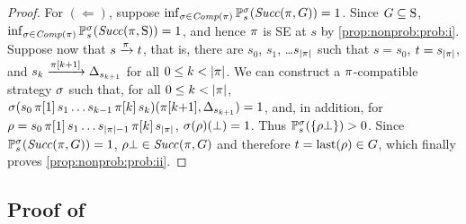 \begin{proof}
  For $(\Leftarrow)$, suppose
  $\inf_{\strat\in\Comp(\plan)}\Prob^\strat_s(\Succ(\plan,G))=1$.
  Since $G\subseteq\S$,
  $\inf_{\strat\in\Comp(\plan)}\Prob^\strat_s(\Succ(\plan,\S))=1$, and
  hence $\plan$ is SE at $s$ by \cref{prop:nonprob:prob:i}.
  Suppose now that $s \reach{\plan} t$, that is, there are $s_0$,
  $s_1$, \ldots $s_{\size{\plan}}$ such that $s=s_0$, $t=s_{\size{\plan}}$, and
  $s_k\reach{\plan[k{+}1]}\Dirac_{s_{k{+}1}}$ for all $0\leq k < \size{\plan}$.
  We can construct a $\plan$-compatible strategy $\strat$
  such that, for all $0\leq k < \size{\plan}$,
  $\strat(s_0\,\plan[1]\,s_1\ldots s_{k{-}1}\,\plan[k]\,s_k)(\plan[k{+}1],\Dirac_{s_{k{+}1}})=1$,
  and, in addition, for
  $\rho = s_0\,\plan[1]\,s_1\ldots s_{\size{\plan}{-}1}\,\plan[k]\,s_{\size{\plan}}$,
  $\strat(\rho)(\complete)=1$.
  Thus $\Prob^\strat_s(\{\rho\bot\})>0$.  Since
  $\Prob^\strat_s(\Succ(\plan,G))=1$, $\rho\bot\in\Succ(\plan,G)$
  and therefore $t=\last(\rho)\in G$, which finally proves
  \cref{prop:nonprob:prob:ii}.
\end{proof}




\subsection{Proof of }


